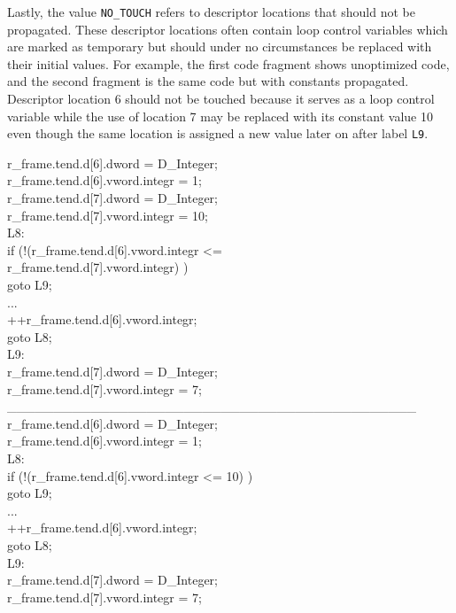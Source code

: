 Lastly, the value \texttt{NO\_TOUCH} refers to descriptor locations
that should not be propagated. These descriptor locations often
contain loop control variables which are marked as temporary but
should under no circumstances be replaced with their initial
values. For example, the first code fragment shows unoptimized code,
and the second fragment is the same code but with constants
propagated. Descriptor location 6 should not be touched because it
serves as a loop control variable while the use of location 7 may be
replaced with its constant value 10 even though the same location is
assigned a new value later on after label \texttt{L9}.

\begin{iconcode}
\>   r\_frame.tend.d[6].dword = D\_Integer; \\
\>   r\_frame.tend.d[6].vword.integr = 1; \\
\>   r\_frame.tend.d[7].dword = D\_Integer; \\
\>   r\_frame.tend.d[7].vword.integr = 10; \\
L8: \\
\>   if (!(r\_frame.tend.d[6].vword.integr {\textless}= \\
\> \> \> \> \> r\_frame.tend.d[7].vword.integr) ) \\
\>  goto L9; \\
\>   ... \\
\>   ++r\_frame.tend.d[6].vword.integr; \\
\>   goto L8; \\
L9: \\
\>   r\_frame.tend.d[7].dword = D\_Integer; \\
\>   r\_frame.tend.d[7].vword.integr = 7; \\
\_\_\_\_\_\_\_\_\_\_\_\_\_\_\_\_\_\_\_\_\_\_\_\_\_\_\_\_\_\_\_\_\_\_\_\_\_\_\_\_\_\_\_\_ \\
\>   r\_frame.tend.d[6].dword = D\_Integer; \\
\>   r\_frame.tend.d[6].vword.integr = 1; \\
L8: \\
\>   if (!(r\_frame.tend.d[6].vword.integr {\textless}= 10) ) \\
\> \>    goto L9; \\
\>   ... \\
\>   ++r\_frame.tend.d[6].vword.integr; \\
\>   goto L8; \\
L9: \\
\>   r\_frame.tend.d[7].dword = D\_Integer; \\
\>   r\_frame.tend.d[7].vword.integr = 7;
\end{iconcode}


